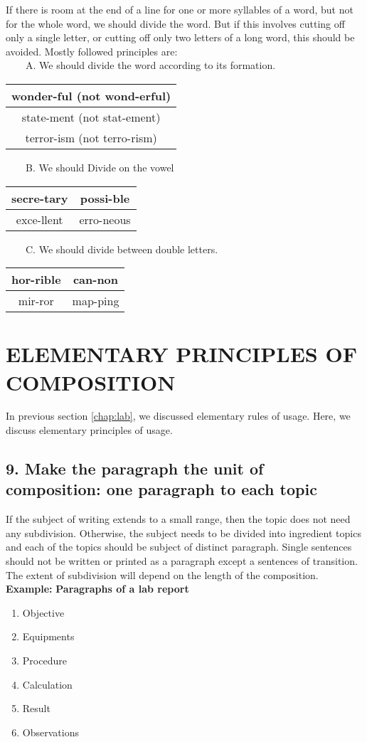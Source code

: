 \documentclass{report}
\newcommand{\TripleRowSingleCol}[3]{
    \begin{center}
    \begin{tabular}{|c|}
     \hline
     #1\\\hline
     #2\\\hline
     #3\\\hline
    \end{tabular}
    \end{center}
}
\newcommand{\DoubleRowDoubleCol}[4]{
    \begin{center}
    \begin{tabular}{|c|c|}
     \hline
     #1 & #2\\\hline
     #3 & #4\\\hline
    \end{tabular}
    \end{center}
}
\begin{document}
If there is room at the end of a line for one or more syllables of a word, but not for
the whole word, we should divide the word. But if this involves cutting off only a single letter, or cutting off only two letters of a long word, this should be avoided. Mostly followed principles are:\\

~~~~A. We should divide the word according to its formation.
\TripleRowSingleCol
{wonder-ful (not wond-erful)}
{state-ment (not stat-ement)}
{terror-ism (not terro-rism)}
\bigskip

~~~~B. We should Divide on the vowel
\DoubleRowDoubleCol{secre-tary}{possi-ble}{exce-llent}{erro-neous}
\bigskip

~~~~C. We should divide between double letters.
\DoubleRowDoubleCol{hor-rible}{can-non}{mir-ror}{map-ping}
\newpage


\chapter{ELEMENTARY PRINCIPLES OF COMPOSITION}
In previous section {\ref{chap:lab}}, we discussed elementary rules of usage. Here, we discuss elementary principles of usage.



\section*{9. Make the paragraph the unit of composition: one paragraph to each topic}

If the subject of writing extends to a small range, then the topic does not need any subdivision. Otherwise, the subject needs to be divided into ingredient topics and each of the topics should be subject of distinct paragraph.
\endgraf\bigskip
Single sentences should not be written or printed as a paragraph except a sentences of transition. The extent of subdivision will depend on the length of the composition.\\

\textbf{\Large{Example:}}
\endgraf\bigskip
\textbf{Paragraphs of a lab report}
\begin{enumerate}
  \item Objective
  \item Equipments
  \item Procedure
  \item Calculation
  \item Result
  \item Observations
\end{enumerate}
\end{document}
